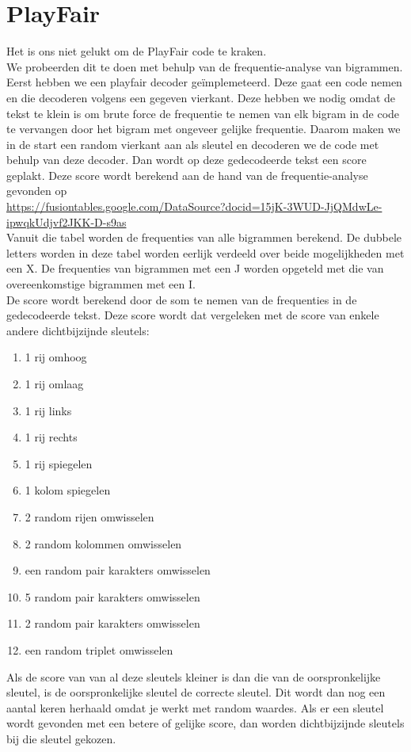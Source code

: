 \documentclass[fleqn]{article}
\begin{document}
	
	
	\section{PlayFair}
	Het is ons niet gelukt om de PlayFair code te kraken.\\
	We probeerden dit te doen met behulp van de frequentie-analyse van bigrammen. Eerst hebben we een playfair decoder ge\"{i}mplemeteerd. Deze gaat een code nemen en die decoderen volgens een gegeven vierkant. Deze hebben we nodig omdat de tekst te klein is om brute force de frequentie te nemen van elk bigram in de code te vervangen door het bigram met ongeveer gelijke frequentie. Daarom maken we in de start een random vierkant aan als sleutel en decoderen we de code met behulp van deze decoder. Dan wordt op deze gedecodeerde tekst een score geplakt. Deze score wordt berekend aan de hand van de frequentie-analyse gevonden op \\ \url{https://fusiontables.google.com/DataSource?docid=15jK-3WUD-JjQMdwLe-ipwqkUdjvf2JKK-D-s9as}\\
	Vanuit die tabel worden de frequenties van alle bigrammen berekend. De dubbele letters worden in deze tabel worden eerlijk verdeeld over beide mogelijkheden met een X. De frequenties van bigrammen met een J worden opgeteld met die van overeenkomstige bigrammen met een I.\\
	De score wordt berekend door de som te nemen van de frequenties in de gedecodeerde tekst.
	Deze score wordt dat vergeleken met de score van enkele andere dichtbijzijnde sleutels:
	\begin{enumerate}
		\item 1 rij omhoog
		\item 1 rij omlaag
		\item 1 rij links
		\item 1 rij rechts
		\item 1 rij spiegelen
		\item 1 kolom spiegelen
		\item 2 random rijen omwisselen
		\item 2 random kolommen omwisselen
		\item een random pair karakters omwisselen
		\item 5 random pair karakters omwisselen
		\item 2 random pair karakters omwisselen
		\item een random triplet omwisselen
	\end{enumerate}
	Als de score van van al deze sleutels kleiner is dan die van de oorspronkelijke sleutel, is de oorspronkelijke sleutel de correcte sleutel. Dit wordt dan nog een aantal keren herhaald omdat je werkt met random waardes. Als er een sleutel wordt gevonden met een betere of gelijke score, dan worden dichtbijzijnde sleutels bij die sleutel gekozen.\\
\end{document}
